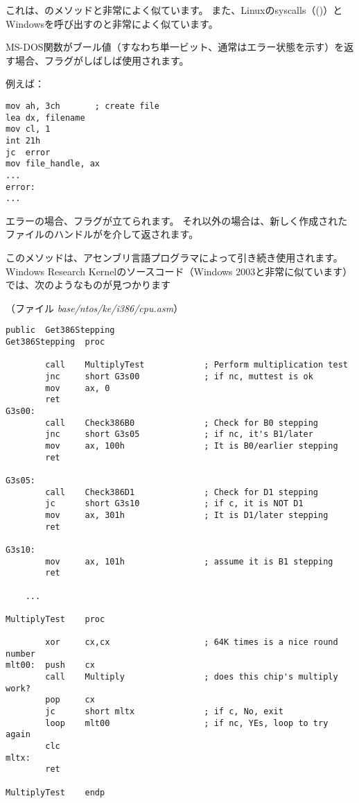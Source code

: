 これは、のメソッドと非常によく似ています。 
また、Linuxのsyscalls（()）とWindowsを呼び出すのと非常によく似ています。

MS-DOS関数がブール値（すなわち単一ビット、通常はエラー状態を示す）を返す場合、フラグがしばしば使用されます。

例えば：

\begin{lstlisting}[style=customasmx86]
mov ah, 3ch       ; create file
lea dx, filename
mov cl, 1
int 21h
jc  error
mov file_handle, ax
...
error:
...
\end{lstlisting}

エラーの場合、フラグが立てられます。 それ以外の場合は、新しく作成されたファイルのハンドルがを介して返されます。

このメソッドは、アセンブリ言語プログラマによって引き続き使用されます。 
Windows Research Kernelのソースコード（Windows 2003と非常に似ています）では、次のようなものが見つかります

（ファイル \emph{base/ntos/ke/i386/cpu.asm}）

\begin{lstlisting}[style=customasmx86]
        public  Get386Stepping
Get386Stepping  proc

        call    MultiplyTest            ; Perform multiplication test
        jnc     short G3s00             ; if nc, muttest is ok
        mov     ax, 0
        ret
G3s00:
        call    Check386B0              ; Check for B0 stepping
        jnc     short G3s05             ; if nc, it's B1/later
        mov     ax, 100h                ; It is B0/earlier stepping
        ret

G3s05:
        call    Check386D1              ; Check for D1 stepping
        jc      short G3s10             ; if c, it is NOT D1
        mov     ax, 301h                ; It is D1/later stepping
        ret

G3s10:
        mov     ax, 101h                ; assume it is B1 stepping
        ret

	...

MultiplyTest    proc

        xor     cx,cx                   ; 64K times is a nice round number
mlt00:  push    cx
        call    Multiply                ; does this chip's multiply work?
        pop     cx
        jc      short mltx              ; if c, No, exit
        loop    mlt00                   ; if nc, YEs, loop to try again
        clc
mltx:
        ret

MultiplyTest    endp
\end{lstlisting}

